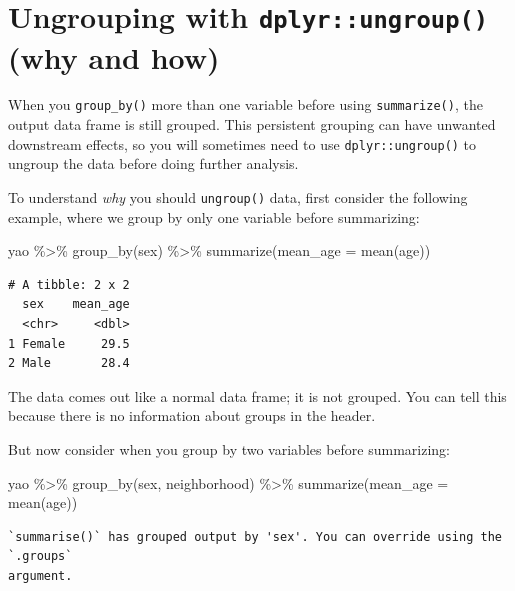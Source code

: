 \documentclass[
  letterpaper,
  DIV=11,
  numbers=noendperiod]{scrreprt}
\newenvironment{Shaded}{\begin{snugshade}}{\end{snugshade}}
\newcommand{\AttributeTok}[1]{\textcolor[rgb]{0.40,0.45,0.13}{#1}}
\newcommand{\FunctionTok}[1]{\textcolor[rgb]{0.28,0.35,0.67}{#1}}
\newcommand{\NormalTok}[1]{\textcolor[rgb]{0.00,0.23,0.31}{#1}}
\newcommand{\SpecialCharTok}[1]{\textcolor[rgb]{0.37,0.37,0.37}{#1}}
\begin{document}
\hypertarget{ungrouping-with-dplyrungroup-why-and-how}{%
\section{\texorpdfstring{Ungrouping with \texttt{dplyr::ungroup()} (why
and
how)}{Ungrouping with dplyr::ungroup() (why and how)}}\label{ungrouping-with-dplyrungroup-why-and-how}}

When you \texttt{group\_by()} more than one variable before using
\texttt{summarize()}, the output data frame is still grouped. This
persistent grouping can have unwanted downstream effects, so you will
sometimes need to use \texttt{dplyr::ungroup()} to ungroup the data
before doing further analysis.

To understand \emph{why} you should \texttt{ungroup()} data, first
consider the following example, where we group by only one variable
before summarizing:

\begin{Shaded}
\begin{Highlighting}[]
\NormalTok{yao }\SpecialCharTok{\%\textgreater{}\%} 
  \FunctionTok{group\_by}\NormalTok{(sex) }\SpecialCharTok{\%\textgreater{}\%} 
  \FunctionTok{summarize}\NormalTok{(}\AttributeTok{mean\_age =} \FunctionTok{mean}\NormalTok{(age))}
\end{Highlighting}
\end{Shaded}

\begin{verbatim}
# A tibble: 2 x 2
  sex    mean_age
  <chr>     <dbl>
1 Female     29.5
2 Male       28.4
\end{verbatim}

The data comes out like a normal data frame; it is not grouped. You can
tell this because there is no information about groups in the header.

But now consider when you group by two variables before summarizing:

\begin{Shaded}
\begin{Highlighting}[]
\NormalTok{yao }\SpecialCharTok{\%\textgreater{}\%} 
  \FunctionTok{group\_by}\NormalTok{(sex, neighborhood) }\SpecialCharTok{\%\textgreater{}\%} 
  \FunctionTok{summarize}\NormalTok{(}\AttributeTok{mean\_age =} \FunctionTok{mean}\NormalTok{(age))}
\end{Highlighting}
\end{Shaded}

\begin{verbatim}
`summarise()` has grouped output by 'sex'. You can override using the `.groups`
argument.
\end{verbatim}
\end{document}
